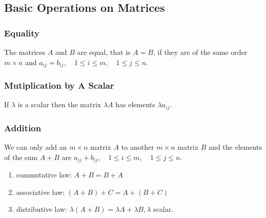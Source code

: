 \documentclass[12pt,a4paper,fleqn]{mycalc}
\begin{document}
	\subsection{Basic Operations on Matrices}
	\subsubsection{Equality}
	The matrices $ A $ and $ B $ are equal, that is $ A = B $, if they are of the same order $ m \times n $ and $ a_{ij}=b_{ij},\quad 1\leq i\leq m,\quad 1\leq j\leq n. $
	\subsubsection{Mutiplication by A Scalar}
	If $ \lambda $ is a scalar then the matrix $ \lambda A $ has elements $ \lambda a_{ij}. $
	\subsubsection{Addition}
	We can only add an $ m \times n $ matrix $ A $ to another $ m \times n $ matrix $ B $ and the elements of the sum $ A + B $ are
	$ a_{ij} + b_{ij},\quad 1 \leq i \leq m,\quad 1 \leq j \leq n. $
	\begin{tcolorbox}[title={Properties of Addition}]
		\begin{enumerate}[i]
			\item commutative law: $ A + B = B + A $
			\item associative law: $ (A + B) + C = A + (B + C) $
			\item distributive law: $ \lambda (A + B) = \lambda A + \lambda B, \lambda $ scalar.
		\end{enumerate}
	\end{tcolorbox}
\end{document}
